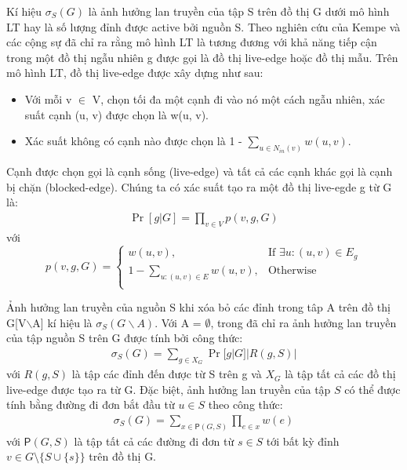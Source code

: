 Kí hiệu $\sigma_{S}(G)$ là ảnh hưởng lan truyền của tập S trên đồ thị G dưới mô hình LT hay là số lượng đỉnh được active bởi nguồn S. Theo nghiên cứu của Kempe và các cộng sự đã chỉ ra rằng mô hình LT là tương đương với khả năng tiếp cận trong một đồ thị ngẫu nhiên g được gọi là đồ thị live-edge hoặc đồ thị mẫu. Trên mô hình LT, đồ thị live-edge được xây dựng như sau:
\begin {itemize}
\item Với mỗi v $\in$ V, chọn tối đa một cạnh đi vào nó một cách ngẫu nhiên, xác suất cạnh (u, v) được chọn là w(u, v).

\item Xác suất không có cạnh nào được chọn là 1 - $\sum_{u \in N_{in}(v)} w(u,v)$.
\end {itemize}

Cạnh được chọn gọi là cạnh sống (live-edge) và tất cả các cạnh khác gọi là cạnh bị chặn (blocked-edge). Chúng ta có xác suất tạo ra một đồ thị live-egde g từ G là:
\begin{align}
\Pr[g|G]=\prod_{v \in V}{p(v,g,G)}
\end{align}
với
\begin{equation}
p(v, g, G)= \left\{ \begin{array}{ll}
w(u, v), & \mbox{If $\exists u: (u, v) \in E_g$}\\
1-\sum_{u:(u, v) \in E}{w(u, v)}, & \mbox{Otherwise}\\
\end{array} \right.
\end{equation}

Ảnh hưởng lan truyền của nguồn S khi xóa bỏ các đỉnh trong tâp A trên đồ thị G[V$\backslash$A] kí hiệu là $\sigma_{S}(G \backslash A)$. Với A = $\emptyset$, trong \cite{kemple1} đã chỉ ra ảnh hưởng lan truyền của tập nguồn S trên G được tính bởi công thức:
\begin{align}
\sigma_S(G)=\sum_{g \in X_G}{\Pr[g|G]|R(g, S)|}
\label{inf_cal}
\end{align}
với $R(g, S)$ là tập các đỉnh đến được từ S trên g và $X_G$ là tập tất cả các đồ thị live-edge được tạo ra từ G. Đặc biệt, ảnh hưởng lan truyền của tập $S$ có thể được tính bằng đường đi đơn bắt đầu từ $u \in S$ theo công thức: 
\begin{align}
\sigma_{S}(G)=\sum_{x \in \mathsf{P}(G, S)} \prod_{e \in x}w(e)
\label{inf_path}
\end{align} 				
với $\mathsf{P}(G, S)$ là tập tất cả các đường đi đơn từ $s \in S$ tới bất kỳ đỉnh $v \in G \setminus \{S \cup \{s\} \} $ trên đồ thị G.		

